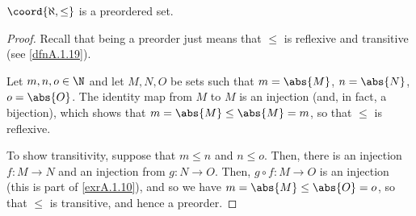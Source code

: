 \begin{prp}{}{}
$\coord{\aleph ,\leq}$ is a preordered set.
\begin{proof}
Recall that being a preorder just means that $\leq$ is reflexive and transitive (see \cref{dfnA.1.19}).

Let $m,n,o\in \N$ and let $M,N,O$ be sets such that $m=\abs{M}$, $n=\abs{N}$, $o=\abs{O}$.  The identity map from $M$ to $M$ is an injection (and, in fact, a bijection), which shows that $m=\abs{M}\leq \abs{M}=m$, so that $\leq$ is reflexive.

To show transitivity, suppose that $m\leq n$ and $n\leq o$.  Then, there is an injection $f\colon M\rightarrow N$ and an injection from $g\colon N\rightarrow O$.  Then, $g\circ f\colon M\rightarrow O$ is an injection (this is part of \cref{exrA.1.10}), and so we have $m=\abs{M}\leq \abs{O}=o$, so that $\leq$ is transitive, and hence a preorder.
\end{proof}
\end{prp}

